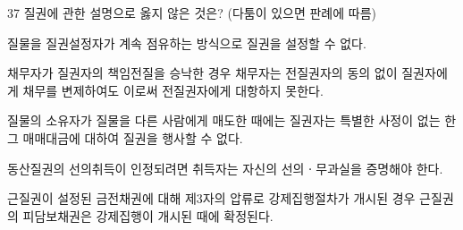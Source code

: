 \begin{question}{37}
질권에 관한 설명으로 옳지 않은 것은? (다툼이 있으면 판례에 따름)
\begin{choices}
  \item 질물을 질권설정자가 계속 점유하는 방식으로 질권을 설정할 수 없다.
  \item 채무자가 질권자의 책임전질을 승낙한 경우 채무자는 전질권자의 동의 없이 질권자에게 채무를 변제하여도 이로써 전질권자에게 대항하지 못한다.
  \item 질물의 소유자가 질물을 다른 사람에게 매도한 때에는 질권자는 특별한 사정이 없는 한 그 매매대금에 대하여 질권을 행사할 수 없다.
  \item 동산질권의 선의취득이 인정되려면 취득자는 자신의 선의ㆍ무과실을 증명해야 한다.
  \item 근질권이 설정된 금전채권에 대해 제3자의 압류로 강제집행절차가 개시된 경우 근질권의 피담보채권은 강제집행이 개시된 때에 확정된다.
\end{choices}
\end{question}
